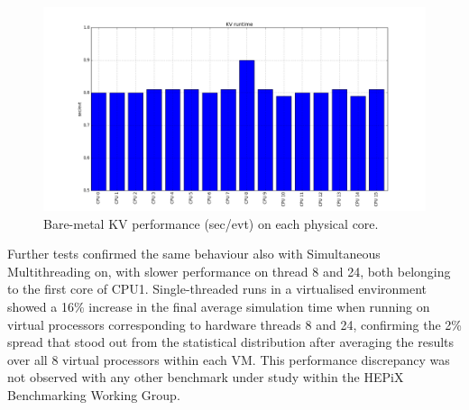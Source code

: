 \documentclass[a4paper]{jpconf}
\begin{document}
\begin{figure}[h]
\begin{center}
\includegraphics[scale=0.3]{images/kv_runtime.png}
\end{center}
\caption{\label{kv-runtime} Bare-metal KV performance (sec/evt) on each physical core. }
\end{figure}
Further tests confirmed the same behaviour also with Simultaneous Multithreading 
on, with slower performance on thread 8 and 24, both belonging to the first core of 
CPU1. Single-threaded runs in a virtualised environment showed a 16\%
increase in the final average simulation time when running on virtual processors
corresponding to hardware threads 8 and 24, confirming the 2\%
spread that stood out from the statistical distribution after averaging the results
over all 8 virtual processors within each VM. This performance discrepancy 
was not observed with any other benchmark under study within the HEPiX Benchmarking 
Working Group.
\end{document}
